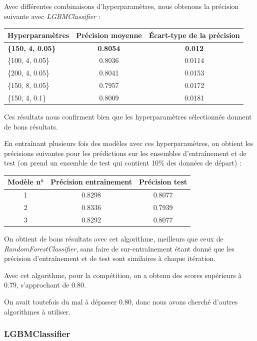 \documentclass[a4paper]{article}
\begin{document}
    Avec différentes combinaisons d'hyperparamètres, nous obtenons la précision suivante avec {\it LGBMClassifier} :

    \begin{tabular}{| l | *{2}{c|}}
        \hline
        Hyperparamètres & Précision moyenne & Écart-type de la précision
        \tabularnewline
        \hline
        \textbf{\{150, 4, 0.05\}} & \textbf{0.8054} & \textbf{0.012} 
        \tabularnewline
        \hline
        \{100, 4, 0.05\} & 0.8036 & 0.0114
        \tabularnewline
        \hline
        \{200, 4, 0.05\} & 0.8041 & 0.0153
        \tabularnewline
        \hline
        \{150, 8, 0.05\} & 0.7957 & 0.0172
        \tabularnewline
        \hline
        \{150, 4, 0.1\} & 0.8009 & 0.0181
        \tabularnewline
        \hline
    \end{tabular}

    Ces résultats nous confirment bien que les hyperparamètres sélectionnés donnent de bons résultats.

    En entraînant plusieurs fois des modèles avec ces hyperparamètres, on obtient les précisions suivantes pour les prédictions 
    sur les ensembles d'entraînement et de test (on prend un ensemble de test qui contient 10\% des données de départ) :

    \begin{tabular}{| *{3}{c|}}
        \hline
        Modèle n° & Précision entraînement & Précision test
        \tabularnewline
        \hline
        1 & 0.8298 & 0.8077
        \tabularnewline
        \hline
        2 & 0.8336 & 0.7939
        \tabularnewline
        \hline
        3 & 0.8292 & 0.8077
        \tabularnewline
        \hline
    \end{tabular}

    On obtient de bons résultats avec cet algorithme,
    meilleurs que ceux de {\it RandomForestClassifier}, 
    sans faire de sur-entraînement étant donné que les précision
    d'entraînement et de test sont similaires à chaque itération.
    
    Avec cet algorithme, pour la compétition, on a obtenu des scores supérieurs à 0.79, s'approchant de 0.80.

    On avait toutefois du mal à dépasser 0.80, donc nous avons cherché d'autres algorithmes à utiliser.

    \subsubsection{LGBMClassifier}
\end{document}
